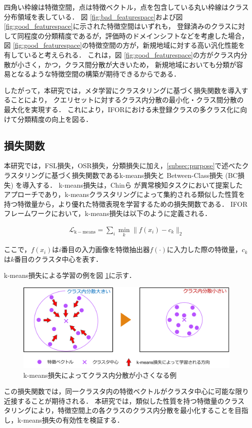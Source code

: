 \documentclass[a4paper,11pt,nomag]{jsreport}
\begin{document}
% 
四角い枠線は特徴空間，点は特徴ベクトル，点を包含している丸い枠線はクラス分布領域を表している．
図 \ref{fig:bad_featurespace}および図 \ref{fig:good_featurespace}に示された特徴空間はいずれも，
登録済みのクラスに対して同程度の分類精度であるが，評価時のドメインシフトなどを考慮した場合，
図 \ref{fig:good_featurespace}の特徴空間の方が，新規地域に対する高い汎化性能を有していると考えられる．
これは，図 \ref{fig:good_featurespace}の方がクラス内分散が小さく，かつ，クラス間分散が大きいため，
新規地域においても分類が容易となるような特徴空間の構築が期待できるからである．

したがって，本研究では，メタ学習にクラスタリングに基づく損失関数を導入することにより，
クエリセットに対するクラス内分散の最小化・クラス間分散の最大化を実現する．
これにより，IFORにおける未登録クラスの多クラス化に向けて分類精度の向上を図る．

\subsection{損失関数}

本研究では，FSL損失，OSR損失，分類損失に加え，\ref{subsec:purpose}で述べたクラスタリングに基づく損失関数であるk-means損失と Between-Class損失 (BC損失) を導入する．
k-means損失は，Chinら \cite{k-means}が異常検知タスクにおいて提案したアプローチであり，k-meansクラスタリングによって集約される類似した性質を持つ特徴量から，より優れた特徴表現を学習するための損失関数である．
IFORフレームワークにおいて，k-means損失は以下のように定義される．

\begin{align}
\mathcal{L}_{\mathrm{k-means}} = \sum_i{\min_k \lVert f(x_i)-c_k \rVert_2}
\end{align}

\noindent
ここで，$f(x_i)$は$i$番目の入力画像を特徴抽出器$f(\cdot)$に入力した際の特徴量，$c_k$は$k$番目のクラスタ中心を表す．

k-means損失による学習の例を図 \ref{fig:kmeans_loss}に示す．
% 
\begin{figure}[tbp]
  \centering
  \includegraphics[width=\linewidth, keepaspectratio]{image/kmeans_loss.png}
  \caption{k-means損失によってクラス内分散が小さくなる例}
  \label{fig:kmeans_loss}
\end{figure}
% 
この損失関数では，同一クラスタ内の特徴ベクトルがクラスタ中心に可能な限り近接することが期待される．
本研究では，類似した性質を持つ特徴量のクラスタリングにより，特徴空間上の各クラスのクラス内分散を最小化することを目指し，k-means損失の有効性を検証する．
\end{document}
